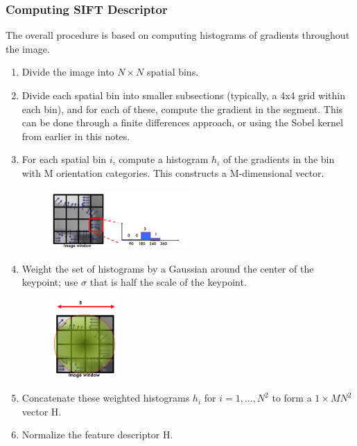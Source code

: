 \documentclass[a4paper, 12pt]{article}
\numberwithin{equation}{section}
\begin{document}
\subsubsection{Computing SIFT Descriptor}
The overall procedure is based on computing histograms of gradients throughout the image.

\begin{enumerate}
\item Divide the image into $N \times N$ spatial bins.
\item Divide each spatial bin into smaller subsections (typically, a 4x4 grid within each bin), and for each of these, compute the gradient in the segment. This can be done through a finite differences approach, or using the Sobel kernel from earlier in this notes. 
\item For each spatial bin $i$, compute a histogram $h_i$ of the gradients in the bin with M orientation categories. This constructs a M-dimensional vector. 

\begin{figure}[h]
\centering
\includegraphics[width=0.5\textwidth]{sift_bins}
\end{figure}

\item Weight the set of histograms by a Gaussian around the center of the keypoint; use $\sigma$ that is half the scale of the keypoint. 

\begin{figure}[h]
\centering
\includegraphics[width=0.25\textwidth]{sift_gblur}
\end{figure}

\item Concatenate these weighted histograms $h_i$ for $i = 1, ..., N^2$ to form a $1 \times MN^2$ vector H. 
\item Normalize the feature descriptor H. 
\end{enumerate}
\end{document}
